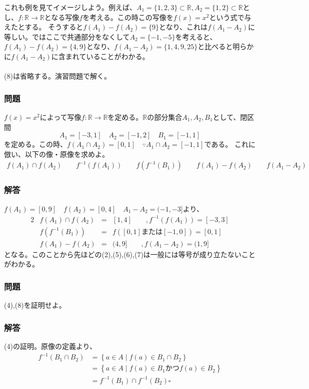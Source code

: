 \documentclass[a4j,dvipdfmx]{jsarticle}
\begin{document}
これも例を見てイメージしよう。例えば、$A_1=\{1,2,3\}\subset\mathbb{R},A_2=\{1,2\}\subset\mathbb{R}$とし、$f:\mathbb{R}\to\mathbb{R}$となる写像$f$を考える。この時この写像を$f(x)=x^2$という式で与えたとする。
そうすると$f(A_1)-f(A_2)=\{9\}$となり、これは$f(A_1-A_2)$に等しい。ではここで共通部分をなくして$A_2=\{-1,-5\}$を考えると、$f(A_1)-f(A_2)=\{4,9\}$となり、$f(A_1-A_2)=\{1,4,9,25\}$と比べると明らかに$f(A_1-A_2)$に含まれていることがわかる。\\
\hrulefill\\
(8)は省略する。演習問題で解く。\\
\hrulefill

\subsubsection*{問題}
$f(x)=x^2$によって写像$f:\mathbb{R}\to\mathbb{R}$を定める。$\mathbb{R}$の部分集合$A_1,A_2,B_1$として、閉区間
\begin{equation*}
    A_1=[-3,1]\quad A_2=[-1,2]\quad B_1=[-1,1] 
\end{equation*}
を定める。この時、$f(A_1\cap A_2)=[0,1]\quad\because A_1\cap A_2=[-1,1]$である。
これに倣い、以下の像・原像を求めよ。
\begin{align*}
    f(A_1)\cap f(A_2)\qquad f^{-1}(f(A_1))\qquad f(f^{-1}(B_1))\qquad f(A_1)-f(A_2)\qquad f(A_1-A_2)
\end{align*}
\vspace{3cm}
\subsubsection*{解答}
\color{red}
$f(A_1)=[0,9]\quad f(A_2)=[0,4]\quad A_1-A_2=(-1,-3]$より、
\begin{alignat*}{2}
    & f(A_1)\cap f(A_2) & = &[1,4]\qquad, f^{-1}(f(A_1))=[-3,3]\\
    & f(f^{-1}(B_1)) & = &f([0,1]\text{または}[-1,0])=[0,1]\\
    & f(A_1)-f(A_2) & = & (4,9]\qquad,f(A_1-A_2)=(1,9]
\end{alignat*}
となる。このことから先ほどの(2),(5),(6),(7)は一般には等号が成り立たないことがわかる。
\color{black}
\newpage
\subsubsection*{問題}
(4),(8)を証明せよ。
\vspace{10cm}
\subsubsection*{解答}
\color{red}
(4)の証明。原像の定義より、
\begin{align*}
    f^{-1}(B_1\cap B_2)
    &=\left\{a\in A\mid f(a)\in B_1\cap B_2\right\}\\
    &=\left\{a\in A\mid f(a)\in B_1\text{かつ} f(a)\in B_2\right\}\\
    &=f^{-1}(B_1)\cap f^{-1}(B_2)\square
\end{align*}
\end{document}
